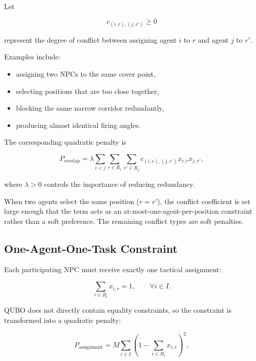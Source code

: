 \documentclass[12pt, a4paper]{article}
\begin{document}
Let

$$
c_{(i,r),(j,r')}
\geq 0
$$

represent the degree of conflict between assigning agent $i$ to $r$ and agent $j$ to $r'$.

Examples include:

\begin{itemize}
\item assigning two NPCs to the same cover point,
\item selecting positions that are too close together,
\item blocking the same narrow corridor redundantly,
\item producing almost identical firing angles.
\end{itemize}

The corresponding quadratic penalty is

$$
P_{\text{overlap}}
=
\lambda
\sum_{i<j}
\sum_{r\in R_i}
\sum_{r'\in R_j}
c_{(i,r),(j,r')}
x_{i,r}x_{j,r'},
$$

where $\lambda > 0$ controls the importance of reducing redundancy.

When two agents select the same position ($r = r'$), the conflict coefficient is set large enough that the term acts as an at-most-one-agent-per-position constraint rather than a soft preference. The remaining conflict types are soft penalties.

\subsection*{One-Agent-One-Task Constraint}

Each participating NPC must receive exactly one tactical assignment:

$$
\sum_{r\in R_i}x_{i,r}=1,
\qquad
\forall i\in I.
$$

QUBO does not directly contain equality constraints, so the constraint is transformed into a quadratic penalty:

$$
P_{\text{assignment}}
=
M
\sum_{i\in I}
\left(
1-
\sum_{r\in R_i}x_{i,r}
\right)^2,
$$
\end{document}
